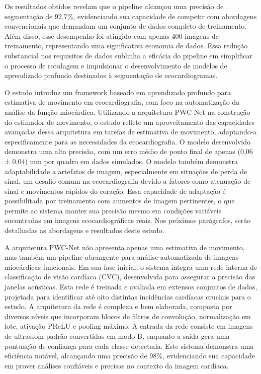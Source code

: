 Os resultados obtidos revelam que o pipeline alcançou uma precisão de segmentação de 92,7\%, evidenciando sua capacidade de competir com abordagens convencionais que demandam um conjunto de dados completo de treinamento. Além disso, esse desempenho foi atingido com apenas 400 imagens de treinamento, representando uma significativa economia de dados. Essa redução substancial nos requisitos de dados sublinha a eficácia do pipeline em simplificar o processo de rotulagem e impulsionar o desenvolvimento de modelos de aprendizado profundo destinados à segmentação de ecocardiogramas.



O estudo \textcite{9335592} introduz um framework baseado em aprendizado profundo para estimativa de movimento em ecocardiografia, com foco na automatização da análise da função miocárdica. Utilizando a arquitetura PWC-Net na construção do estimador de movimento, o estudo reflete um aproveitamento das capacidades avançadas dessa arquitetura em tarefas de estimativa de movimento, adaptando-a especificamente para as necessidades da ecocardiografia. O modelo desenvolvido demonstra uma alta precisão, com um erro médio de ponto final de apenas (0,06 ± 0,04) mm por quadro em dados simulados. O modelo também demonstra adaptabilidade a artefatos de imagem, especialmente em situações de perda de sinal, um desafio comum na ecocardiografia devido a fatores como atenuação de sinal e movimentos rápidos do coração. Essa capacidade de adaptação é possibilitada por treinamento com aumentos de imagem pertinentes, o que permite ao sistema manter sua precisão mesmo em condições variáveis encontradas em imagens ecocardiográficas reais. Nos próximos parágrafos, serão detalhadas as abordagens e resultados deste estudo.

A arquitetura PWC-Net não apresenta apenas uma estimativa de movimento, mas também um pipeline abrangente para análise automatizada de imagens miocárdicas funcionais. Em sua fase inicial, o sistema integra uma rede interna de classificação de visão cardíaca (CVC), desenvolvida para assegurar a precisão das janelas acústicas. Esta rede é treinada e avaliada em extensos conjuntos de dados, projetada para identificar até oito distintas incidências cardíacas cruciais para o estudo. A arquitetura da rede é complexa e bem elaborada, composta por diversos níveis que incorporam blocos de filtros de convolução, normalização em lote, ativação PReLU e pooling máximo. A entrada da rede consiste em imagens de ultrassom padrão convertidas em modo B, enquanto a saída gera uma pontuação de confiança para cada classe detectada. Este sistema demonstra uma eficiência notável, alcançando uma precisão  de 98\%, evidenciando sua capacidade em prover análises confiáveis e precisas no contexto da imagem cardíaca.

